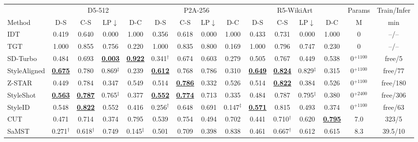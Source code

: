 \documentclass[letterpaper]{article} %
\begin{document}
\begin{table}[t]
\centering
{\small
\setlength{\tabcolsep}{1mm}
\begin{tabular}{@{}lcccccccccccccc@{}}
\toprule
& \multicolumn{4}{c}{D5-512}
& \multicolumn{4}{c}{P2A-256}
& \multicolumn{4}{c}{R5-WikiArt}
& Params & Train/Infer \\
\cmidrule(lr){2-5}\cmidrule(lr){6-9}\cmidrule(lr){10-13}\cmidrule(lr){14-14}\cmidrule(lr){15-15}
Method
& D-S & C-S & LP$\downarrow$ & D-C
& D-S & C-S & LP$\downarrow$ & D-C
& D-S & C-S & LP$\downarrow$ & D-C
& M & min \\
\midrule
IDT & 0.419 & 0.640 & 0.000 & 1.000 & 0.356 & 0.618 & 0.000 & 1.000 & 0.433 & 0.731 & 0.000 & 1.000 & 0 & --/-- \\
TGT & 1.000 & 0.855 & 0.756 & 0.220 & 1.000 & 0.835 & 0.800 & 0.169 & 1.000 & 0.796 & 0.747 & 0.230 & 0 & --/-- \\
SD-Turbo & 0.484 & 0.693 & \underline{\underline{\textbf{0.003}}} & \underline{\underline{\textbf{0.922}}} & 0.341$^{\dagger}$ & 0.674 & 0.603 & 0.279 & 0.505 & 0.767 & 0.449 & 0.538 & 0$^{+1100}$ & free/5 \\
StyleAligned & \underline{\underline{\textbf{0.675}}} & 0.780 & 0.869$^{\ddagger}$ & 0.239 & \underline{\underline{\textbf{0.612}}} & 0.768 & 0.786 & 0.310 & \underline{\underline{\textbf{0.649}}} & \underline{\underline{\textbf{0.824}}} & 0.829$^{\ddagger}$ & 0.315 & 0$^{+1100}$ & free/77 \\
Z-STAR & 0.449 & 0.784 & 0.347 & 0.549 & 0.514 & \underline{\underline{\textbf{0.786}}} & 0.332 & 0.526 & 0.514 & \underline{\textbf{0.822}} & 0.384 & 0.526 & 0$^{+1100}$ & free/180 \\
StyleShot & \underline{\textbf{0.563}} & \underline{\textbf{0.787}} & 0.765$^{\ddagger}$ & 0.377 & \underline{\textbf{0.552}} & \underline{\textbf{0.774}} & 0.713 & 0.335 & 0.484 & 0.787 & 0.795$^{\ddagger}$ & 0.380 & 0$^{+2400}$ & free/306 \\
StyleID & 0.548 & \underline{\underline{\textbf{0.822}}} & 0.552 & 0.416 & 0.256$^{\dagger}$ & 0.648 & 0.691 & 0.147$^{\ddagger}$ & \underline{\textbf{0.571}} & 0.815 & 0.493 & 0.374 & 0$^{+1100}$ & free/63 \\
CUT & 0.471 & 0.714 & 0.374 & 0.795 & 0.539 & 0.754 & 0.494 & 0.702 & 0.441 & 0.710$^{\dagger}$ & 0.620 & \underline{\textbf{0.795}} & 7.0 & 323/5 \\
SaMST & 0.271$^{\dagger}$ & 0.618$^{\dagger}$ & 0.749 & 0.145$^{\ddagger}$ & 0.501 & 0.709 & 0.398 & 0.838 & 0.461 & 0.667$^{\dagger}$ & 0.612 & 0.615 & 8.3 & 39.5/10 \\

\end{tabular}}
\end{table}
\end{document}
